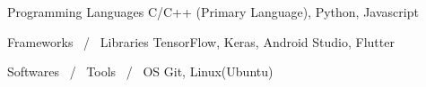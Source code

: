 

\begin{cvskills}

  \cvskill
    {Programming Languages} %
    {C/C++ (Primary Language), Python, Javascript} %


  \cvskill
    {Frameworks \, / \, Libraries} %
    {TensorFlow, Keras, Android Studio, Flutter} %

\cvskill
    {Softwares \, / \, Tools \, / \, OS} %
    {Git, Linux(Ubuntu)} %

\end{cvskills}

